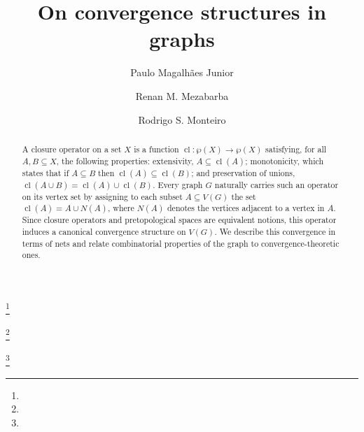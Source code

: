 \documentclass{amsart}
\theoremstyle{definition}
\theoremstyle{remark}
\numberwithin{equation}{section}
\begin{document}
\title{On convergence structures in graphs}



\author{Paulo Magalhães Junior}
\address{ Departamento de Matemática \\
	Universidade Federal do Piauí\\
	\\ Teresina, PI \\
 64049-550 
}
\curraddr{
}
\thanks{}


\author{Renan M. Mezabarba}
\address{Departamento de Ciências Exatas, Universidade Estadual de Santa Cruz, Ilhéus, BA, 45662-900}
\curraddr{}
\thanks{}

\author{Rodrigo S. Monteiro}
\address{Instituto de Ciências Matemáticas e de Computação, Universidade de São Paulo, São Carlos, SP, 13566-590}
\curraddr{}
\thanks{}






\begin{abstract}
A closure operator on a set $X$ is a function $\operatorname{cl}: \wp(X) \to \wp(X)$ satisfying, for all $A, B \subseteq X$, the following properties: extensivity, $A \subseteq \operatorname{cl}(A)$; monotonicity, which states that if $A \subseteq B$ then $\operatorname{cl}(A) \subseteq \operatorname{cl}(B)$; and preservation of unions, $\operatorname{cl}(A \cup B) = \operatorname{cl}(A) \cup \operatorname{cl}(B)$. Every graph $G$ naturally carries such an operator on its vertex set by assigning to each subset $A \subseteq V(G)$ the set $\operatorname{cl}(A) = A \cup N(A)$, where $N(A)$ denotes the vertices adjacent to a vertex in $A$. Since closure operators and pretopological spaces are equivalent notions, this operator induces a canonical convergence structure on $V(G)$. We describe this convergence in terms of nets and relate combinatorial properties of the graph to convergence-theoretic ones.
\end{abstract}
\end{document}
